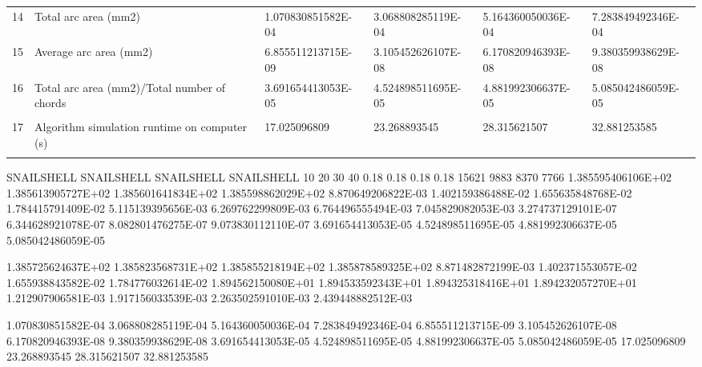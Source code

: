 \begin{tabular}{ p{0.5cm} p{8.0cm} p{4.00cm} p{4.0cm} p{4.00cm} p{4.0cm}}
14	& Total arc area (mm2)	                               & 1.070830851582E-04	& 3.068808285119E-04   & 5.164360050036E-04	& 7.283849492346E-04 \\
15	& Average arc area (mm2)	                           & 6.855511213715E-09	& 3.105452626107E-08   & 6.170820946393E-08	& 9.380359938629E-08 \\
16	& Total arc area (mm2)/Total number of chords	       & 3.691654413053E-05	& 4.524898511695E-05   & 4.881992306637E-05	& 5.085042486059E-05 \\
	&                                                      &                    &                      &                    & \\
17	& Algorithm simulation runtime on computer (s)         & 17.025096809	    & 23.268893545	       & 28.315621507	    & 32.881253585 \\
	&                                                      &                    &                      &                    & 
\end{tabular}


SNAILSHELL	SNAILSHELL	SNAILSHELL	SNAILSHELL
10	20	30	40
0.18	0.18	0.18	0.18
15621	9883	8370	7766
1.385595406106E+02	1.385613905727E+02	1.385601641834E+02	1.385598862029E+02
8.870649206822E-03	1.402159386488E-02	1.655635848768E-02	1.784415791409E-02
5.115139395656E-03	6.269762299809E-03	6.764496555494E-03	7.045829082053E-03
3.274737129101E-07	6.344628921078E-07	8.082801476275E-07	9.073830112110E-07
3.691654413053E-05	4.524898511695E-05	4.881992306637E-05	5.085042486059E-05

1.385725624637E+02	1.385823568731E+02	1.385855218194E+02	1.385878589325E+02
8.871482872199E-03	1.402371553057E-02	1.655938843582E-02	1.784776032614E-02
1.894562150080E+01	1.894533592343E+01	1.894325318416E+01	1.894232057270E+01
1.212907906581E-03	1.917156033539E-03	2.263502591010E-03	2.439448882512E-03

1.070830851582E-04	3.068808285119E-04	5.164360050036E-04	7.283849492346E-04
6.855511213715E-09	3.105452626107E-08	6.170820946393E-08	9.380359938629E-08
3.691654413053E-05	4.524898511695E-05	4.881992306637E-05	5.085042486059E-05
17.025096809	23.268893545	28.315621507	32.881253585

